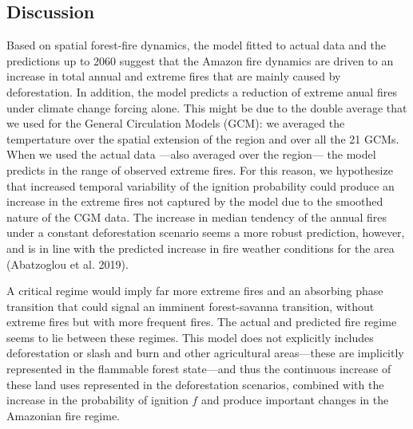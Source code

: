 \documentclass[
]{article}
\begin{document}
\subsection{Discussion}\label{discussion}

Based on spatial forest-fire dynamics, the model fitted to actual data
and the predictions up to 2060 suggest that the Amazon fire dynamics are
driven to an increase in total annual and extreme fires that are mainly
caused by deforestation. In addition, the model predicts a reduction of
extreme anual fires under climate change forcing alone. This might be
due to the double average that we used for the General Circulation
Models (GCM): we averaged the tempertature over the spatial extension of
the region and over all the 21 GCMs. When we used the actual data
---also averaged over the region--- the model predicts in the range of
observed extreme fires. For this reason, we hypothesize that increased
temporal variability of the ignition probability could produce an
increase in the extreme fires not captured by the model due to the
smoothed nature of the CGM data. The increase in median tendency of the
annual fires under a constant deforestation scenario seems a more robust
prediction, however, and is in line with the predicted increase in fire
weather conditions for the area (Abatzoglou et al. 2019).

A critical regime would imply far more extreme fires and an absorbing
phase transition that could signal an imminent forest-savanna
transition, without extreme fires but with more frequent fires. The
actual and predicted fire regime seems to lie between these regimes.
This model does not explicitly includes deforestation or slash and burn
and other agricultural areas---these are implicitly represented in the
flammable forest state---and thus the continuous increase of these land
uses represented in the deforestation scenarios, combined with the
increase in the probability of ignition \(f\) and produce important
changes in the Amazonian fire regime.
\end{document}
